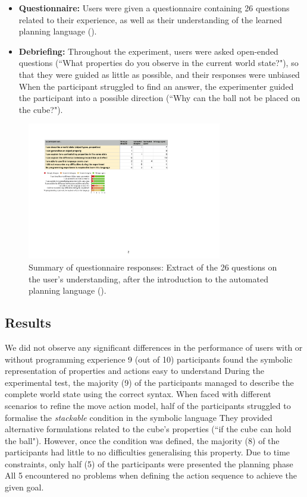 \begin{itemize}
  \item{\textbf{Questionnaire:} Users were given a questionnaire containing 26 questions related to their experience, as well as their understanding of the learned planning language ().}
   \item {\textbf{Debriefing:} Throughout the experiment, users were asked open-ended questions (``What properties do you observe in the current world state?"), so that they were guided as little as possible, and their responses were unbiased
When the participant struggled to find an answer, the experimenter guided the participant into a possible direction (``Why can the ball not be placed on the cube?").} 
\end{itemize}

 \begin{figure}[t]
  \centering
  \includegraphics[width=8.5cm]{figures/eEvaluation2}
  \caption{Summary of questionnaire responses: Extract of the 26 questions on the user's understanding, after the introduction to the automated planning language ().}
  \label{fig:eEvaluation2}
\end{figure} 
\subsection{Results}
We did not observe any significant differences in the performance of users with or without programming experience
9 (out of 10) participants found the symbolic representation of properties and actions easy to understand
During the experimental test, the majority (9) of the participants managed to describe the complete world state using the correct syntax.
When faced with different scenarios to refine the move action model, half of the participants struggled to formalise the \textit{stackable} condition in the symbolic language
They provided alternative formulations related to the cube's properties (``if the cube can hold the ball").
However, once the condition was defined, the majority (8) of the participants had little to no difficulties generalising this property.
Due to time constraints, only half (5) of the participants were presented the planning phase
All 5 encountered no problems when defining the action sequence to achieve the given goal.

